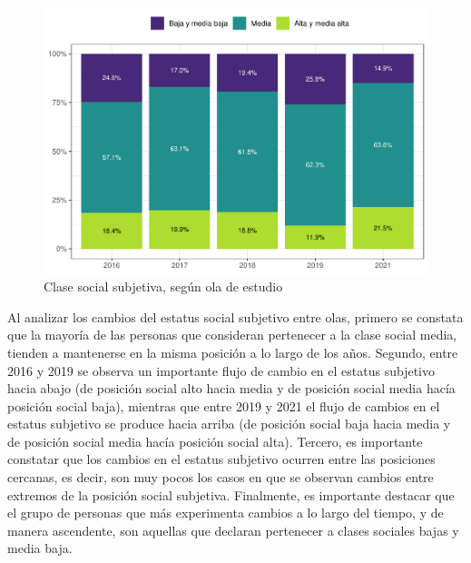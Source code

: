 \documentclass[
  12pt,
]{book}
\begin{document}
\begin{figure}

{\centering \includegraphics{reporte-elsoc_files/figure-latex/ess-ola-1} 

}

\caption{Clase social subjetiva, según ola de estudio}\label{fig:ess-ola}
\end{figure}

Al analizar los cambios del estatus social subjetivo entre olas, primero se constata que la mayoría de las personas que consideran pertenecer a la clase social media, tienden a mantenerse en la misma posición a lo largo de los años. Segundo, entre 2016 y 2019 se observa un importante flujo de cambio en el estatus subjetivo hacia abajo (de posición social alto hacia media y de posición social media hacía posición social baja), mientras que entre 2019 y 2021 el flujo de cambios en el estatus subjetivo se produce hacia arriba (de posición social baja hacia media y de posición social media hacía posición social alta). Tercero, es importante constatar que los cambios en el estatus subjetivo ocurren entre las posiciones cercanas, es decir, son muy pocos los casos en que se observan cambios entre extremos de la posición social subjetiva. Finalmente, es importante destacar que el grupo de personas que más experimenta cambios a lo largo del tiempo, y de manera ascendente, son aquellas que declaran pertenecer a clases sociales bajas y media baja.
\end{document}

